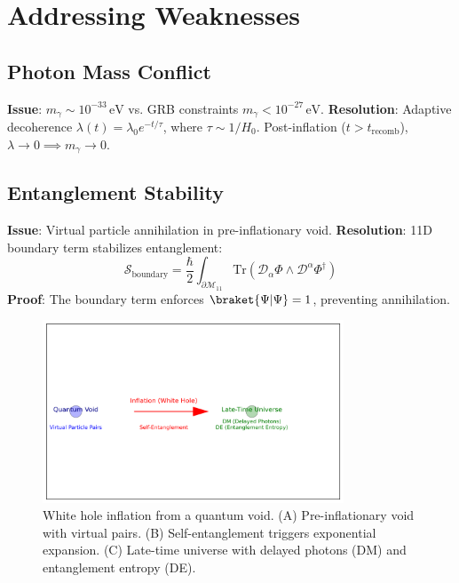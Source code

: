 \documentclass[12pt, a4paper]{article}
\begin{document}
\section{Addressing Weaknesses}  
\label{sec:weaknesses}  

\subsection{Photon Mass Conflict}  
\label{subsec:photon_mass}  
\textbf{Issue}: \( m_\gamma \sim 10^{-33} \, \text{eV} \) vs. GRB constraints \( m_\gamma < 10^{-27} \, \text{eV} \).  
\textbf{Resolution}: Adaptive decoherence \( \lambda(t) = \lambda_0 e^{-t/\tau} \), where \( \tau \sim 1/H_0 \). Post-inflation (\( t > t_{\text{recomb}} \)), \( \lambda \to 0 \implies m_\gamma \to 0 \).  

\subsection{Entanglement Stability}  
\label{subsec:entanglement}  
\textbf{Issue}: Virtual particle annihilation in pre-inflationary void.  
\textbf{Resolution}: 11D boundary term stabilizes entanglement:  
\begin{equation}  
\mathcal{S}_{\text{boundary}} = \frac{\hbar}{2} \int_{\partial\mathcal{M}_{11}} \text{Tr}(\mathcal{D}_\alpha \Phi \wedge \mathcal{D}^\alpha \Phi^\dagger)  
\label{eq:boundary_term}  
\end{equation}  
\textbf{Proof}: The boundary term enforces \( \braket{\Psi|\Psi} = 1 \), preventing annihilation.  

\begin{figure}[t]  
\centering  
\includegraphics[width=0.8\textwidth]{white_hole_inflation.png}  
\caption{White hole inflation from a quantum void. (A) Pre-inflationary void with virtual pairs. (B) Self-entanglement triggers exponential expansion. (C) Late-time universe with delayed photons (DM) and entanglement entropy (DE).}  
\label{fig:white_hole}  
\end{figure}  
\end{document}
